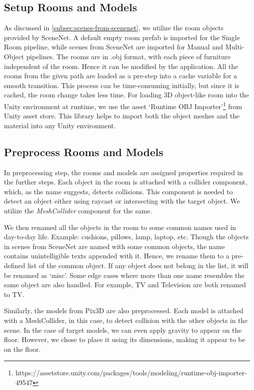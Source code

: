 \subsection{Setup Rooms and Models}\label{subsec:implementation_setup_rooms_models}
As discussed in \autoref{subsec:scenes-from-scenenet}, we utilize the room objects provided by SceneNet.
A default empty room prefab is imported for the Single Room pipeline, while scenes from SceneNet are imported for Manual and Multi-Object pipelines.
The rooms are in .obj format, with each piece of furniture independent of the room. Hence it can be modified by the application.
All the rooms from the given path are loaded as a pre-step into a cache variable for a smooth transition.
This process can be time-consuming initially, but since it is cached, the room change takes less time.
For loading 3D object-like room into the Unity environment at runtime, we use the asset `Runtime OBJ Importer'\footnote{https://assetstore.unity.com/packages/tools/modeling/runtime-obj-importer-49547} from Unity asset store.
This library helps to import both the object meshes and the material into any Unity environment.

\subsection{Preprocess Rooms and Models}\label{subsec:implementation_preprocess_rooms_models}
In preprocessing step, the rooms and models are assigned properties required in the further steps.
Each object in the room is attached with a collider component, which, as the name suggests, detects collisions.
This component is needed to detect an object either using raycast or intersecting with the target object.
We utilize the \emph{MeshCollider} component for the same.

We then renamed all the objects in the room to some common names used in day-to-day life.
Example: cushions, pillows, lamp, laptop, etc.
Though the objects in scenes from SceneNet are named with some common objects, the name contains unintelligible texts appended with it.
Hence, we rename them to a pre-defined list of the common object.
If any object does not belong in the list, it will be renamed as `misc'.
Some edge cases where more than one name resembles the same object are also handled.
For example, TV and Television are both renamed to TV.

Similarly, the models from Pix3D are also preprocessed.
Each model is attached with a MeshCollider, in this case, to detect collision with the other objects in the scene.
In the case of target models, we can even apply gravity to appear on the floor.
However, we chose to place it using its dimensions, making it appear to be on the floor.

